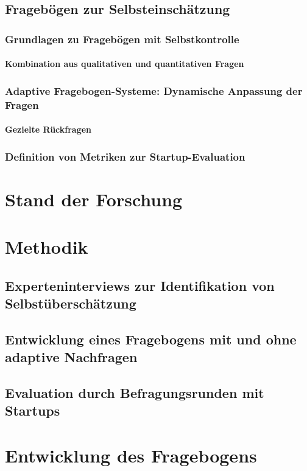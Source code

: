 \section{Fragebögen zur Selbsteinschätzung}
\subsection{Grundlagen zu Fragebögen mit Selbstkontrolle}
\subsubsection{Kombination aus qualitativen und quantitativen Fragen}
\subsection{Adaptive Fragebogen-Systeme: Dynamische Anpassung der Fragen}
\subsubsection{Gezielte Rückfragen}
\subsection{Definition von Metriken zur Startup-Evaluation}

\chapter{Stand der Forschung}

\chapter{Methodik}

\section{Experteninterviews zur Identifikation von Selbstüberschätzung}
\section{Entwicklung eines Fragebogens mit und ohne adaptive Nachfragen}
\section{Evaluation durch  Befragungsrunden mit Startups}

\chapter{Entwicklung des Fragebogens}


